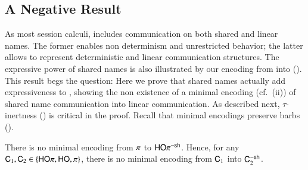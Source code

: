 
\subsection{A Negative Result}
\noi As most session calculi, 
\HOp includes communication on both shared and linear names.
The former enables non determinism and unrestricted behavior; the latter allows to represent
deterministic and linear communication structures.
The expressive power of shared names is also illustrated by our 
encoding from \HOp into \sessp ().
This result begs the question: 
Here we prove that shared names actually add expressiveness to \HOp,
showing 
the non existence of a minimal encoding 
(cf.~(ii))
of shared name communication into linear 
communication. 
As described next, 
$\tau$-inertness () is critical in the proof.
Recall that minimal encodings preserve barbs ().

\begin{theorem}\rm
\label{t:negative}
There is no %
minimal
encoding 
from $\pi$ to $\mathsf{HO}\pi^{\mathsf{-sh}}$. Hence, 
for any $\mathsf{C}_1,\mathsf{C}_2\in \{ \mathsf{HO}\pi, \mathsf{HO}, \pi\}$, 
there is no 
minimal
encoding from $\mathsf{C}_1$ into $\mathsf{C}_2^{-\mathsf{sh}}$.  
\end{theorem}


